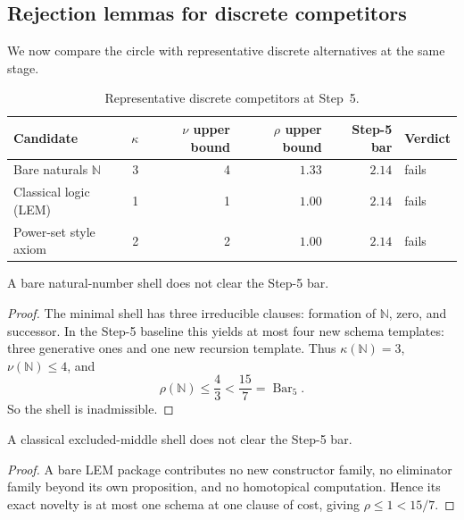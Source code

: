 \documentclass{lmcs}
\newcommand{\N}{\mathbb{N}}
\newcommand{\SelBar}{\operatorname{Bar}}
\begin{document}
\subsection{Rejection lemmas for discrete competitors}

We now compare the circle with representative discrete alternatives at the same stage.

\begin{table}[tbp]
\centering
\caption{Representative discrete competitors at Step~5.}
\label{tab:step5-discrete}
\small
\begin{tabular}{@{}lrrrrl@{}}
\toprule
Candidate & $\kappa$ & $\nu$ upper bound & $\rho$ upper bound & Step-5 bar & Verdict \\
\midrule
Bare naturals $\N$ & 3 & 4 & $1.33$ & $2.14$ & fails \\
Classical logic (LEM) & 1 & 1 & $1.00$ & $2.14$ & fails \\
Power-set style axiom & 2 & 2 & $1.00$ & $2.14$ & fails \\
\bottomrule
\end{tabular}
\end{table}

\begin{lem}
\label{lem:naturals-fail}
A bare natural-number shell does not clear the Step-5 bar.
\end{lem}

\begin{proof}
The minimal shell has three irreducible clauses: formation of $\N$, zero, and successor. In the Step-5 baseline this yields at most four new schema templates: three generative ones and one new recursion template. Thus $\kappa(\N)=3$, $\nu(\N)\leq 4$, and
\[
  \rho(\N) \leq \frac{4}{3} < \frac{15}{7} = \SelBar_5.
\]
So the shell is inadmissible.
\end{proof}

\begin{lem}
\label{lem:lem-fail}
A classical excluded-middle shell does not clear the Step-5 bar.
\end{lem}

\begin{proof}
A bare LEM package contributes no new constructor family, no eliminator family beyond its own proposition, and no homotopical computation. Hence its exact novelty is at most one schema at one clause of cost, giving $\rho \leq 1 < 15/7$.
\end{proof}
\end{document}
